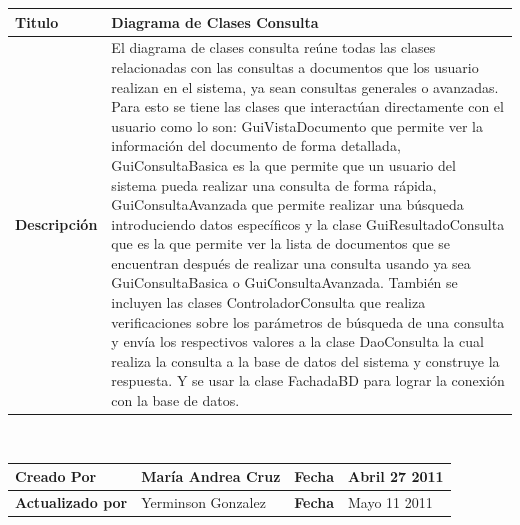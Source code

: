 			
	\begin{tabular}{|p{5cm}|p{11cm}|}\hline
	{\bf Titulo} & {Diagrama de Clases Consulta}\\
	\hline
	{\bf Descripción} & {El diagrama de clases consulta reúne todas las clases
	relacionadas con las consultas a documentos que los usuario realizan en el sistema,
	ya sean consultas generales o avanzadas. Para esto se tiene las clases que interactúan
	directamente con el usuario como lo son: GuiVistaDocumento que permite ver la información del
	documento de forma detallada, GuiConsultaBasica es la que permite que un usuario del sistema
	pueda realizar una consulta de forma rápida, GuiConsultaAvanzada que permite realizar una
	búsqueda introduciendo datos específicos y la clase GuiResultadoConsulta que es la que permite
	ver la lista de documentos que se encuentran después de realizar una consulta usando ya sea
	GuiConsultaBasica o GuiConsultaAvanzada.\newline
	También se incluyen las clases ControladorConsulta que realiza verificaciones sobre los
	parámetros de búsqueda de una consulta y envía los respectivos valores a la clase DaoConsulta
	la cual realiza la consulta a la base de datos del sistema y construye la respuesta. Y se usar
	la clase FachadaBD para lograr la conexión con la base de datos.}\\
	\hline
	\end{tabular}\\[.5cm]
		
	\begin{tabular}{|p{3.5cm}|p{4.5cm}|p{2.5cm}|p{4.5cm}|}\hline
	{\bf Creado Por} & {María Andrea Cruz} & {\bf Fecha} & {Abril 27 2011}\\
	\hline
	{\bf Actualizado por} & {Yerminson Gonzalez} & {\bf Fecha} & {Mayo 11 2011}\\
	\hline
	\end{tabular}


